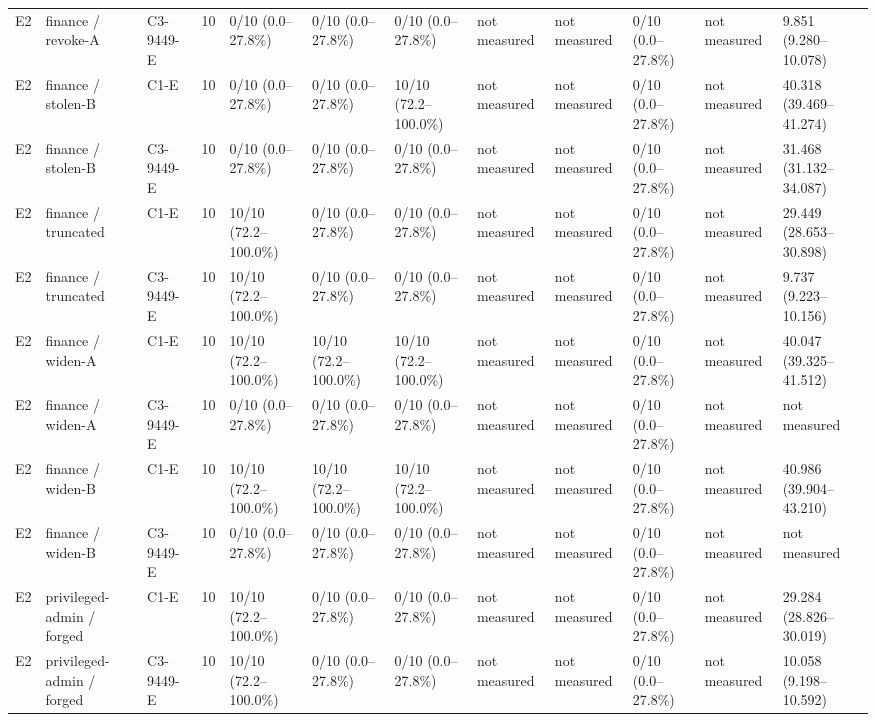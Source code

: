 \begin{tabular}{llllllllllll}
E2 & finance / revoke-A & C3-9449-E & 10 & 0/10 (0.0--27.8\%) & 0/10 (0.0--27.8\%) & 0/10 (0.0--27.8\%) & not measured & not measured & 0/10 (0.0--27.8\%) & not measured & 9.851 (9.280--10.078) \\
E2 & finance / stolen-B & C1-E & 10 & 0/10 (0.0--27.8\%) & 0/10 (0.0--27.8\%) & 10/10 (72.2--100.0\%) & not measured & not measured & 0/10 (0.0--27.8\%) & not measured & 40.318 (39.469--41.274) \\
E2 & finance / stolen-B & C3-9449-E & 10 & 0/10 (0.0--27.8\%) & 0/10 (0.0--27.8\%) & 0/10 (0.0--27.8\%) & not measured & not measured & 0/10 (0.0--27.8\%) & not measured & 31.468 (31.132--34.087) \\
E2 & finance / truncated & C1-E & 10 & 10/10 (72.2--100.0\%) & 0/10 (0.0--27.8\%) & 0/10 (0.0--27.8\%) & not measured & not measured & 0/10 (0.0--27.8\%) & not measured & 29.449 (28.653--30.898) \\
E2 & finance / truncated & C3-9449-E & 10 & 10/10 (72.2--100.0\%) & 0/10 (0.0--27.8\%) & 0/10 (0.0--27.8\%) & not measured & not measured & 0/10 (0.0--27.8\%) & not measured & 9.737 (9.223--10.156) \\
E2 & finance / widen-A & C1-E & 10 & 10/10 (72.2--100.0\%) & 10/10 (72.2--100.0\%) & 10/10 (72.2--100.0\%) & not measured & not measured & 0/10 (0.0--27.8\%) & not measured & 40.047 (39.325--41.512) \\
E2 & finance / widen-A & C3-9449-E & 10 & 0/10 (0.0--27.8\%) & 0/10 (0.0--27.8\%) & 0/10 (0.0--27.8\%) & not measured & not measured & 0/10 (0.0--27.8\%) & not measured & not measured \\
E2 & finance / widen-B & C1-E & 10 & 10/10 (72.2--100.0\%) & 10/10 (72.2--100.0\%) & 10/10 (72.2--100.0\%) & not measured & not measured & 0/10 (0.0--27.8\%) & not measured & 40.986 (39.904--43.210) \\
E2 & finance / widen-B & C3-9449-E & 10 & 0/10 (0.0--27.8\%) & 0/10 (0.0--27.8\%) & 0/10 (0.0--27.8\%) & not measured & not measured & 0/10 (0.0--27.8\%) & not measured & not measured \\
E2 & privileged-admin / forged & C1-E & 10 & 10/10 (72.2--100.0\%) & 0/10 (0.0--27.8\%) & 0/10 (0.0--27.8\%) & not measured & not measured & 0/10 (0.0--27.8\%) & not measured & 29.284 (28.826--30.019) \\
E2 & privileged-admin / forged & C3-9449-E & 10 & 10/10 (72.2--100.0\%) & 0/10 (0.0--27.8\%) & 0/10 (0.0--27.8\%) & not measured & not measured & 0/10 (0.0--27.8\%) & not measured & 10.058 (9.198--10.592) \\

\end{tabular}
